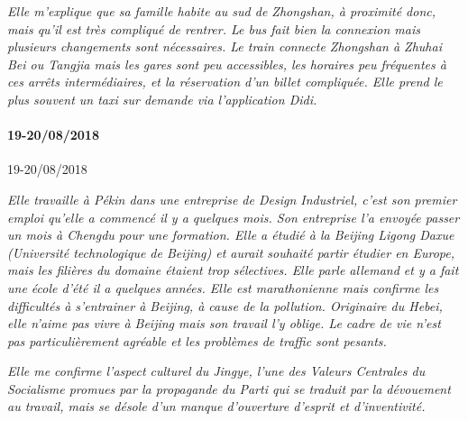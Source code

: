 \textit{Elle m'explique que sa famille habite au sud de Zhongshan, à proximité donc, mais qu'il est très compliqué de rentrer. Le bus fait bien la connexion mais plusieurs changements sont nécessaires. Le train connecte Zhongshan à Zhuhai Bei ou Tangjia mais les gares sont peu accessibles, les horaires peu fréquentes à ces arrêts intermédiaires, et la réservation d'un billet compliquée. Elle prend le plus souvent un taxi sur demande via l'application Didi.}



\paragraph{19-20/08/2018}{19-20/08/2018}


\textit{Elle travaille à Pékin dans une entreprise de Design Industriel, c'est son premier emploi qu'elle a commencé il y a quelques mois. Son entreprise l'a envoyée passer un mois à Chengdu pour une formation. Elle a étudié à la Beijing Ligong Daxue (Université technologique de Beijing) et aurait souhaité partir étudier en Europe, mais les filières du domaine étaient trop sélectives. Elle parle allemand et y a fait une école d'été il a quelques années. Elle est marathonienne mais confirme les difficultés à s'entrainer à Beijing, à cause de la pollution. Originaire du Hebei, elle n'aime pas vivre à Beijing mais son travail l'y oblige. Le cadre de vie n'est pas particulièrement agréable et les problèmes de traffic sont pesants.}

\textit{Elle me confirme l'aspect culturel du \emph{Jingye}, l'une des Valeurs Centrales du Socialisme promues par la propagande du Parti qui se traduit par la dévouement au travail, mais se désole d'un manque d'ouverture d'esprit et d'inventivité.}






\stars











